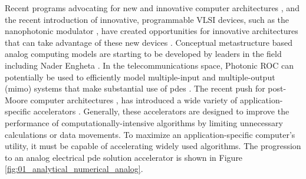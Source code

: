 \par Recent programs advocating for new and innovative computer architectures \cite{darpa2017}, and the recent introduction of innovative, programmable VLSI devices, such as the nanophotonic modulator \cite{V.Sorger_2012}, have created opportunities for innovative architectures that can take advantage of these new devices \cite{A.Mehrabia_2018,S.Sun_2018}. Conceptual metastructure based analog computing models are starting to be developed by leaders in the field including Nader Engheta \cite{Mohammadi_Estakhri1333}.  In the telecommunications space, Photonic ROC can potentially be used to efficiently model \gls{multiple-input and multiple-output} (\acrshort{mimo}) systems that make substantial use of \acrshort{pde}s \cite{tsoulos2006mimo}. The recent push for \gls{post-Moore} computer architectures \cite{darpa2017}, has introduced a wide variety of application-specific accelerators \cite{hu2016dot,bojnordi2016memristive,J.George_2017}.  Generally, these accelerators are designed to improve the performance of computationally-intensive algorithms by limiting unnecessary calculations or data movements. To maximize an application-specific computer's utility, it must be capable of accelerating widely used algorithms. The progression to an analog electrical \acrshort{pde} solution accelerator is shown in Figure \ref{fig:01_analytical_numerical_analog}.

